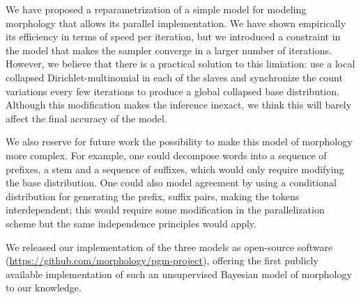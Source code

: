 We have proposed a reparametrization of a simple model for modeling morphology that allows its parallel implementation. We have shown empirically its efficiency in terms of speed per iteration, but we introduced a constraint in the model that makes the sampler converge in a larger number of iterations. However, we believe that there is a practical solution to this limiation: use a local collapsed Dirichlet-multinomial in each of the slaves and synchronize the count variations every few iterations to produce a global collapsed base distribution. Although this modification makes the inference inexact, we think this will barely affect the final accuracy of the model.

We also reserve for future work the possibility to make this model of morphology more complex. For example, one could decompose words into a sequence of prefixes, a stem and a sequence of suffixes, which would only require modifying the base distribution. One could also model agreement by using a conditional distribution for generating the prefix, suffix pairs, making the tokens interdependent; this would require some modification in the parallelization scheme but the same independence principles would apply.

We released our implementation of the three models as open-source software (\url{https://github.com/morphology/pgm-project}), offering the first publicly available implementation of such an unsupervised Bayesian model of morphology to our knowledge.
